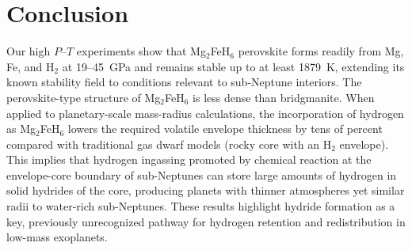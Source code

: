 \documentclass[draft,jgrga,12pt]{agujournal2019}
\begin{document}



\section{Conclusion}


Our high $P$--$T$ experiments show that Mg$_2$FeH$_6$ perovskite forms readily from Mg, Fe, and H$_2$ at 19--45~{GPa} and remains stable up to at least 1879~K, extending its known stability field to conditions relevant to sub-Neptune interiors. 
The perovskite-type structure of Mg$_2$FeH$_6$ is less dense than bridgmanite. 
When applied to planetary-scale mass-radius calculations, the incorporation of hydrogen as Mg$_2$FeH$_6$ lowers the required volatile envelope thickness by tens of percent compared with traditional gas dwarf models (rocky core with an H$_2$ envelope). 
This implies that hydrogen ingassing promoted by chemical reaction at the envelope-core boundary of sub-Neptunes can store large amounts of hydrogen in solid hydrides of the core, producing planets with thinner atmospheres yet similar radii to water-rich sub-Neptunes. 
These results highlight hydride formation as a key, previously unrecognized pathway for hydrogen retention and redistribution in low-mass exoplanets.
\end{document}
